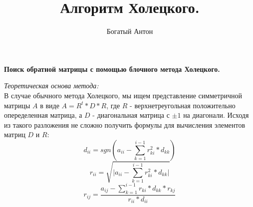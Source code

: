 \documentclass[12pt,a4paper]{article}
\author{Богатый Антон}
\title{Алгоритм Холецкого.}
\begin{document}
\begin{center}
\textbf{Поиск обратной матрицы с помощью блочного метода Холецкого.}
\end{center}
\textit{Теоретическая основа метода:}
\\
\indent В случае обычного метода Холецкого, мы ищем представление симметричной матрицы
$A$ в виде $A = R^t * D * R$, где $R$ - верхнетреугольная положительно опеределенная матрица, 
а $D$ - диагональная матрица с ${\pm}1$ на диагонали. Исходя из такого разложения не сложно получить формулы
для вычисления элементов матриц $D$ и $R$:
$$d_{i i} = sgn({a_{i i} - \sum_{k=1}^{i-1} {r_{k i}^2 * d_{k k}}})$$ 
$$r_{i i} = \sqrt{\vert a_{i i} - \sum_{k=1}^{i-1} r_{k i}^2 * d_{k k} \vert}$$
$$r_{i j} = \dfrac{a_{i j} - \sum_{k=1}^{i-1} r_{k i} * d_{k k} * r_{k j}}{r_{i i} * d_{i i}}$$
\end{document}
